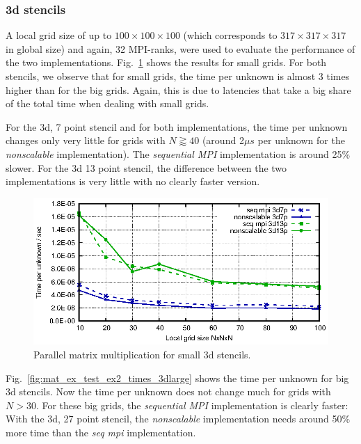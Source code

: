 \subsubsection*{3d stencils}
A local grid size of up to $100 \times 100 \times 100$ (which corresponds to $317 \times 317 \times 317$ in global size) and again, 32 MPI-ranks, were used to evaluate the performance of the two implementations.  Fig.~\ref{fig:mat_ex_test_ex2_times_3dsmall} shows the results for small grids. For both stencils, we observe that for small grids, the time per unknown is almost 3 times higher than for the big grids. Again, this is due to latencies that take a big share of the total time when dealing with small grids.

For the 3d, 7 point stencil and for both implementations, the time per unknown changes only very little for grids with $N \gtrapprox 40$ (around 2$\mu  s$ per unknown for the \textit{nonscalable} implementation). The \textit{sequential MPI} implementation is around 25\% slower. For the 3d 13 point stencil, the difference between the two implementations is very little with no clearly faster version. 


\begin{figure}[tbp]
	\centering
	\vspace*{-2.5mm}\includegraphics[width=1\textwidth]{times_3dsmall}
	\caption{Parallel matrix multiplication for small 3d stencils. } 
	\label{fig:mat_ex_test_ex2_times_3dsmall}
\end{figure}

Fig.~\ref{fig:mat_ex_test_ex2_times_3dlarge} shows the time per unknown for big 3d stencils. Now the time per unknown does not change much for grids with $N > 30$. For these big grids, the \textit{sequential MPI} implementation is clearly faster: With the 3d, 27 point stencil, the \textit{nonscalable} implementation needs around 50\% more time than the \textit{seq mpi} implementation. 

